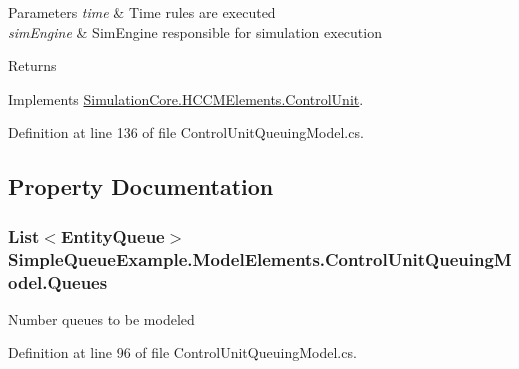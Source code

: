 \begin{DoxyParams}{Parameters}
{\em time} & Time rules are executed\\
\hline
{\em sim\+Engine} & Sim\+Engine responsible for simulation execution\\
\hline
\end{DoxyParams}
\begin{DoxyReturn}{Returns}

\end{DoxyReturn}


Implements \hyperlink{class_simulation_core_1_1_h_c_c_m_elements_1_1_control_unit_aed1c77ff5912ad0868ba1ec8f314a698}{Simulation\+Core.\+H\+C\+C\+M\+Elements.\+Control\+Unit}.



Definition at line 136 of file Control\+Unit\+Queuing\+Model.\+cs.



\subsection{Property Documentation}
\subsubsection[{\texorpdfstring{Queues}{Queues}}]{\setlength{\rightskip}{0pt plus 5cm}List$<${\bf Entity\+Queue}$>$ Simple\+Queue\+Example.\+Model\+Elements.\+Control\+Unit\+Queuing\+Model.\+Queues\hspace{0.3cm}{\ttfamily [get]}}\hypertarget{class_simple_queue_example_1_1_model_elements_1_1_control_unit_queuing_model_a299eaa9cc3197a30fd5480a3ff7d8724}{}\label{class_simple_queue_example_1_1_model_elements_1_1_control_unit_queuing_model_a299eaa9cc3197a30fd5480a3ff7d8724}


Number queues to be modeled 



Definition at line 96 of file Control\+Unit\+Queuing\+Model.\+cs.

